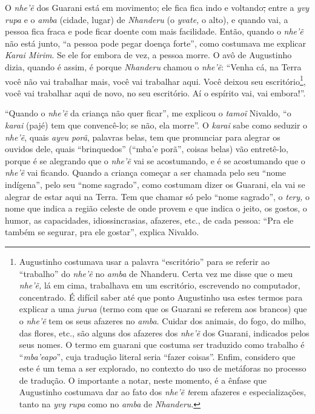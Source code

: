 O \emph{nhe'ẽ} dos Guarani está em movimento; ele fica fica indo e
voltando\sout{,} entre a \emph{yvy rupa} e o \emph{amba} (cidade, lugar)
de \emph{Nhanderu} (o \emph{yvate,} o alto), e quando vai, a pessoa fica
fraca e pode ficar doente com mais facilidade. Então, quando o
\emph{nhe'ẽ} não está junto, ``a pessoa pode pegar doença forte'', como
costumava me explicar \emph{Karai Mirim}. Se ele for embora de vez, a
pessoa morre. O avô de Augustinho dizia, quando é assim, é porque
\emph{Nhanderu} chamou o \emph{nhe'ẽ}: ``Venha cá, na Terra você não vai
trabalhar mais, você vai trabalhar aqui. Você deixou seu
escritório\footnote{Augustinho costumava usar a palavra ``escritório''
  para se referir ao ``trabalho'' do \emph{nhe'ẽ} no \emph{amba} de
  Nhanderu. Certa vez me disse que o meu \emph{nhe'ẽ,} lá em cima,
  trabalhava em um escritório, escrevendo no computador, concentrado. É
  difícil saber até que ponto Augustinho usa estes termos para explicar
  a uma \emph{jurua} (termo com que os Guarani se referem aos brancos)
  que o \emph{nhe'ẽ} tem os seus afazeres no \emph{amba}. Cuidar dos
  animais, do fogo, do milho, das flores, etc., são alguns dos afazeres
  dos \emph{nhe'ẽ} dos Guarani, indicados pelos seus nomes. O termo em
  guarani que costuma ser traduzido como trabalho é ``\emph{mba'eapo}'',
  cuja tradução literal seria ``fazer coisas''. Enfim, considero que
  este é um tema a ser explorado, no contexto do uso de metáforas no
  processo de tradução. O importante a notar, neste momento, é a ênfase
  que Augustinho costumava dar ao fato dos \emph{nhe'ẽ t}erem afazeres e
  especializações, tanto na \emph{yvy rupa} como no \emph{amba} de
  \emph{Nhanderu}.}, você vai trabalhar aqui de novo, no seu escritório.
Aí o espírito vai, vai embora!''.

``Quando o \emph{nhe'ẽ} da criança não quer ficar'', me explicou o
\emph{tamoĩ} Nivaldo, ``o \emph{karai} (pajé) tem que convencê-lo; se
não, ela morre''. O \emph{karai} sabe como seduzir o \emph{nhe'ẽ}, quais
\emph{ayvu porã}, palavras belas, tem que pronunciar para alegrar os
ouvidos dele, quais ``brinquedos'' (``mba'e porã'', coisas belas) vão
entretê-lo, porque é se alegrando que o \emph{nhe'ẽ} vai se acostumando,
e é se acostumando que o \emph{nhe'ẽ} vai ficando. Quando a criança
começar a ser chamada pelo seu ``nome indígena'', pelo seu ``nome
sagrado'', como costumam dizer os Guarani, ela vai se alegrar de estar
aqui na Terra. Tem que chamar só pelo ``nome sagrado'', o \emph{tery,} o
nome que indica a região celeste de onde provem e que indica o jeito, os
gostos, o humor, as capacidades, idiossincrasias, afazeres, etc., de
cada pessoa: ``Pra ele também se segurar, pra ele gostar'', explica
Nivaldo.


